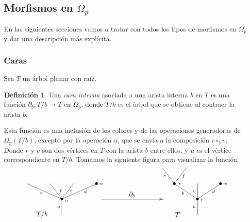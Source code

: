 \documentclass[11pt,a4paper,openright,oneside]{article}
\numberwithin{equation}{section}
\theoremstyle{definition}
\newtheorem{defi}[teo]{Definici\'on}
\begin{document}
\subsection{Morfismos en $\Omega_p$}
En las siguientes secciones vamos a tratar con todos los tipos de morfismos en $\Omega_p$ y dar una descripci\'on m\'as expl\'icita.
\subsubsection{Caras}
Sea $T$ un \'arbol planar con ra\'iz.
\begin{defi}
    Una \emph{cara interna} asociada a una arista interna $b$ en $T$ es una funci\'on $\partial_b \colon T/b\to T$ en $\Omega_p$, donde $T/b$ es el \'arbol que se obtiene al contraer la arista $b$.

    Esta funci\'on es una inclusi\'on de los colores y de las operaciones generadoras de $\Omega_p(T/b)$, excepto por la operaci\'on $u$, que se env\'ia a la composici\'on $r\circ_b v$.
    Donde $r$ y $v$ son dos v\'ertices en $T$ con la arista $b$ entre ellos, y $u$ es el v\'ertice correspondiente en $T/b$. Tomamos la siguiente figura para visualizar la funci\'on.
    \begin{equation}
        \xy
        <0.08cm, 0cm>:
        (0.0, 0.0)*{}="1"; %
        (0.0, 10.0)*=0{\bullet}="2"; %
        (-22.5, 20.0)*{}="3"; %
        (-7.5, 20.0)*{}="4"; %
        (7.5, 20.0)*{}="5"; %
        (22.5, 20.0)*=0{\bullet}="6"; %
        "1";"2" **\dir{-};
        "2";"3" **\dir{-};
        "2";"4" **\dir{-};
        "2";"5" **\dir{-};
        "2";"6" **\dir{-};
        (3.0, 9.0)*=0{\scriptstyle u};
        (25.5, 20.0)*=0{\scriptstyle w};
        (-2.0, 5.0)*=0{\scriptstyle a};
        (-13.25, 14.0)*=0{\scriptstyle e};
        (-1, 15.0)*=0{\scriptstyle f};
        (5.75, 15.0)*=0{\scriptstyle c};
        (15.25, 15.0)*=0{\scriptstyle d};
        (-13,0)*{T/b};
        \endxy
        \xy
        <0.08cm, 0cm>:
        (-20, 0.0)*{}="1";
        (20, 0.0)*{}="2";
        (20, 10)*{}="3";
        (-20, 10)*{}="4";
        {\ar(-20, 10)*{};(20,10)*{}};
        (0,13)*{\partial_b};
        \endxy
        \xy
        <0.08cm, 0cm>:
        (0.0, 0.0)*{}="1"; %
        (0.0, 10.0)*=0{\bullet}="2"; %
        (-15.0, 20.0)*=0{\bullet}="3"; %
        (-22.5, 30.0)*{}="4"; %
        (-7.5, 30.0)*{}="5"; %
        (0.0, 20.0)*{}="6"; %
        (15.0, 20.0)*=0{\bullet}="7"; %
        "1";"2" **\dir{-};
        "2";"3" **\dir{-};
        "3";"4" **\dir{-};
        "3";"5" **\dir{-};
        "2";"6" **\dir{-};
        "2";"7" **\dir{-};
        (3.0, 9.5)*=0{\scriptstyle r};
        (-11.5, 20.0)*=0{\scriptstyle v};
        (-2.0, 5.0)*=0{\scriptstyle a};
        (-9.5, 14.0)*=0{\scriptstyle b};
        (-21.3, 25.0)*=0{\scriptstyle e};
        (-9, 25.0)*=0{\scriptstyle f};
        (-2.0, 15.0)*=0{\scriptstyle c};
        (10.4, 15.0)*=0{\scriptstyle d};
        (18.0, 20.0)*=0{\scriptstyle w};
        (-13,0)*{T};
        \endxy
    \end{equation}
\end{defi}
\end{document}
